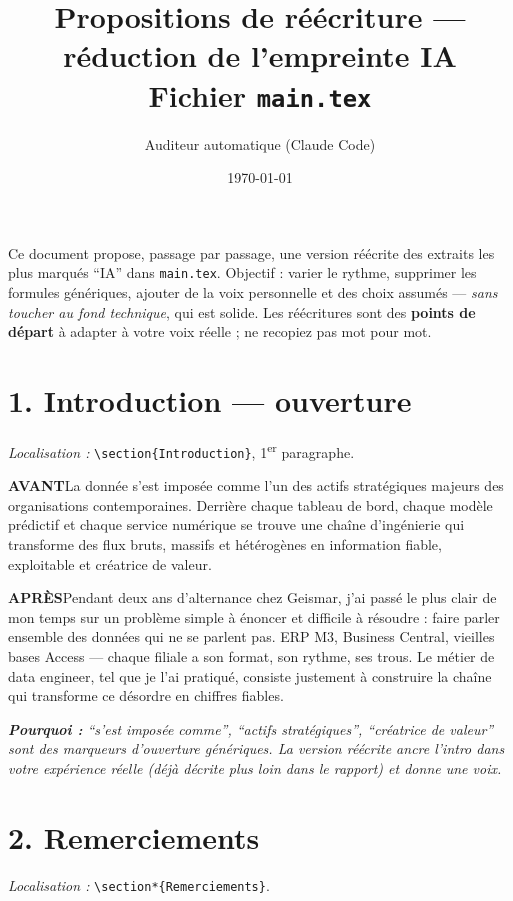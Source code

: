 \documentclass[11pt,a4paper]{article}
\title{Propositions de réécriture --- réduction de l'empreinte IA\\\large Fichier \texttt{main.tex}}
\author{Auditeur automatique (Claude Code)}
\date{\today}
\newcommand{\av}{\textbf{\textcolor{avant}{AVANT}}\quad}
\newcommand{\ap}{\textbf{\textcolor{apres}{APRÈS}}\quad}
\newcommand{\pourquoi}[1]{\par\smallskip\noindent\textit{\textbf{Pourquoi :} #1}\par\smallskip}
\begin{document}
\maketitle

\noindent Ce document propose, passage par passage, une version réécrite des extraits les
plus marqués \enquote{IA} dans \texttt{main.tex}. Objectif : varier le rythme, supprimer
les formules génériques, ajouter de la voix personnelle et des choix assumés --- \emph{sans
toucher au fond technique}, qui est solide. Les réécritures sont des \textbf{points de
départ} à adapter à votre voix réelle ; ne recopiez pas mot pour mot.

\bigskip
\section*{1. Introduction --- ouverture}
\noindent\textit{Localisation :} \texttt{\textbackslash section\{Introduction\}}, 1\textsuperscript{er} paragraphe.

\begin{avantbox}
\av La donnée s'est imposée comme l'un des actifs stratégiques majeurs des organisations
contemporaines. Derrière chaque tableau de bord, chaque modèle prédictif et chaque service
numérique se trouve une chaîne d'ingénierie qui transforme des flux bruts, massifs et
hétérogènes en information fiable, exploitable et créatrice de valeur.
\end{avantbox}
\begin{apresbox}
\ap Pendant deux ans d'alternance chez Geismar, j'ai passé le plus clair de mon temps sur
un problème simple à énoncer et difficile à résoudre : faire parler ensemble des données
qui ne se parlent pas. ERP M3, Business Central, vieilles bases Access --- chaque filiale
a son format, son rythme, ses trous. Le métier de data engineer, tel que je l'ai pratiqué,
consiste justement à construire la chaîne qui transforme ce désordre en chiffres fiables.
\end{apresbox}
\pourquoi{\enquote{s'est imposée comme}, \enquote{actifs stratégiques}, \enquote{créatrice
de valeur} sont des marqueurs d'ouverture génériques. La version réécrite ancre l'intro
dans votre expérience réelle (déjà décrite plus loin dans le rapport) et donne une voix.}

\section*{2. Remerciements}
\noindent\textit{Localisation :} \texttt{\textbackslash section*\{Remerciements\}}.
\end{document}
